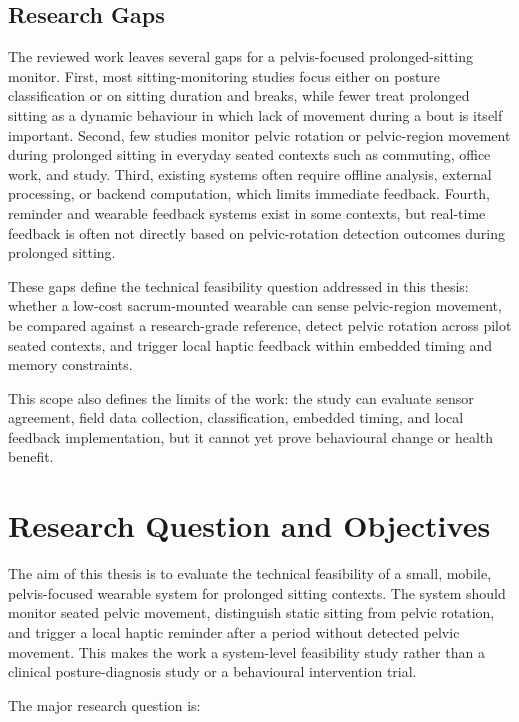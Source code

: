 \subsection{Research Gaps}\label{sec:intro_gaps}

The reviewed work leaves several gaps for a pelvis-focused prolonged-sitting monitor. First, most sitting-monitoring studies focus either on posture classification or on sitting duration and breaks, while fewer treat prolonged sitting as a dynamic behaviour in which lack of movement during a bout is itself important. Second, few studies monitor pelvic rotation or pelvic-region movement during prolonged sitting in everyday seated contexts such as commuting, office work, and study. Third, existing systems often require offline analysis, external processing, or backend computation, which limits immediate feedback. Fourth, reminder and wearable feedback systems exist in some contexts, but real-time feedback is often not directly based on pelvic-rotation detection outcomes during prolonged sitting.

These gaps define the technical feasibility question addressed in this thesis: whether a low-cost sacrum-mounted wearable can sense pelvic-region movement, be compared against a research-grade reference, detect pelvic rotation across pilot seated contexts, and trigger local haptic feedback within embedded timing and memory constraints.

This scope also defines the limits of the work: the study can evaluate sensor agreement, field data collection, classification, embedded timing, and local feedback implementation, but it cannot yet prove behavioural change or health benefit.

\section{Research Question and Objectives}\label{sec:intro_aim}

The aim of this thesis is to evaluate the technical feasibility of a small, mobile, pelvis-focused wearable system for prolonged sitting contexts. The system should monitor seated pelvic movement, distinguish static sitting from pelvic rotation, and trigger a local haptic reminder after a period without detected pelvic movement. This makes the work a system-level feasibility study rather than a clinical posture-diagnosis study or a behavioural intervention trial.

The major research question is:

